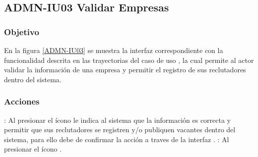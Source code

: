 \clearpage
\subsection{ADMN-IU03 Validar Empresas}

\subsubsection{Objetivo}
En la figura \ref{ADMN-IU03} se muestra la interfaz correspondiente con la funcionalidad descrita en las trayectorias del caso de uso , 
la cual permite al actor validar la información de una empresa y permitir el registro de sus reclutadores dentro del sistema.

\subsubsection{Acciones}
\Titem \IUAprobarE{} : Al presionar el ícono le indica al sistema que la información es correcta y permitir que sus reclutadores se registren y/o publiquen vacantes dentro del sistema, para ello debe de confirmar la acción a traves de la interfaz .
\Titem \IUDescartar{} : Al presionar el ícono .

  

\clearpage
